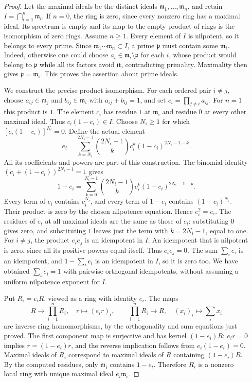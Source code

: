 \begin{proof}
Let the maximal ideals be the distinct ideals
$\mathfrak m_1,\ldots,\mathfrak m_n$, and retain
$I=\bigcap_{i=1}^n\mathfrak m_i$.
If $n=0$, the ring is zero, since every nonzero ring has a
maximal ideal. Its spectrum is empty and its map to the empty
product of rings is the isomorphism of zero rings. Assume $n\geq1$.
Every element of $I$ is nilpotent, so it belongs to every prime.
Since $\mathfrak m_1\cdots\mathfrak m_n\subset I$, a prime
$\mathfrak p$ must contain some $\mathfrak m_i$.
Indeed, otherwise one could choose $a_i\in\mathfrak m_i\setminus
\mathfrak p$ for each $i$, whose product would belong to
$\mathfrak p$ while all its factors avoid it, contradicting
primality. Maximality then gives $\mathfrak p=\mathfrak m_i$.
This proves the assertion about prime ideals.

We construct the precise product isomorphism. For each ordered
pair $i\neq j$, choose $a_{ij}\in\mathfrak m_j$ and
$b_{ij}\in\mathfrak m_i$ with $a_{ij}+b_{ij}=1$, and set
$c_i=\prod_{j\neq i}a_{ij}$. For $n=1$ this product is $1$.
The element $c_i$ has residue $1$ at $\mathfrak m_i$ and
residue $0$ at every other maximal ideal. Thus
$c_i(1-c_i)\in I$. Choose $N_i\geq1$ for which
$[c_i(1-c_i)]^{N_i}=0$. Define the actual element
$$
e_i=\sum_{k=N_i}^{2N_i-1}
\binom{2N_i-1}{k}c_i^k(1-c_i)^{2N_i-1-k}.
$$
All its coefficients and powers are part of this construction.
The binomial identity $(c_i+(1-c_i))^{2N_i-1}=1$ gives
$$
1-e_i=\sum_{k=0}^{N_i-1}
\binom{2N_i-1}{k}c_i^k(1-c_i)^{2N_i-1-k}.
$$
Every term of $e_i$ contains $c_i^{N_i}$, and every term of
$1-e_i$ contains $(1-c_i)^{N_i}$. Their product is zero by
the chosen nilpotence equation. Hence $e_i^2=e_i$.
The residues of $e_i$ at all maximal ideals are the same as
those of $c_i$: substituting $0$ gives zero, and substituting
$1$ leaves just the term with $k=2N_i-1$, equal to one.
For $i\neq j$, the product $e_ie_j$ is an idempotent in $I$.
An idempotent that is nilpotent is zero, since all its positive
powers equal itself. Thus $e_ie_j=0$.
The sum $\sum_i e_i$ is an idempotent, and
$1-\sum_i e_i$ is an idempotent in $I$, so it is zero too.
We have obtained $\sum_i e_i=1$ with pairwise orthogonal
idempotents, without assuming a uniform nilpotence exponent for $I$.

Put $R_i=e_iR$, viewed as a ring with identity $e_i$.
The maps
$$
R\longrightarrow\prod_{i=1}^n R_i,\quad r\longmapsto(e_ir)_i,
\qquad
\prod_{i=1}^n R_i\longrightarrow R,\quad (x_i)_i\longmapsto\sum_i x_i
$$
are inverse ring homomorphisms, by the orthogonality and sum
equations just proved. The first component map is surjective
and has kernel $(1-e_i)R$: $e_ir=0$ implies
$r=(1-e_i)r$, and the reverse implication follows from
$e_i(1-e_i)=0$.
Maximal ideals of $R_i$ correspond to maximal ideals of $R$
containing $(1-e_i)R$. By the computed residues, only
$\mathfrak m_i$ contains $1-e_i$.
Therefore $R_i$ is a nonzero local ring with unique maximal
ideal $e_i\mathfrak m_i$.


\end{proof}
